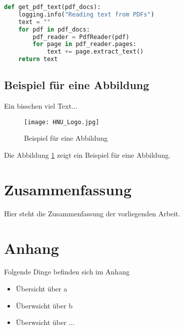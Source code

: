 \documentclass[12pt, a4paper, twoside]{article} %
\begin{document}
\begin{lstlisting}[language=Python, caption=Beispiel für Python-Code]
    def get_pdf_text(pdf_docs):
    logging.info("Reading text from PDFs")
    text = ""
    for pdf in pdf_docs:
        pdf_reader = PdfReader(pdf)
        for page in pdf_reader.pages:
            text += page.extract_text()
    return text
\end{lstlisting}



\subsection{Beispiel für eine Abbildung}
Ein bisschen viel Text... \lipsum[1] 

\begin{figure}[h!]
\centering
\texttt{[image: HNU\_Logo.jpg]}
\caption{Beispiel für eine Abbildung}
\label{fig:beispiel}
\end{figure}
Die Abbildung \ref{fig:beispiel} zeigt ein Beispiel für eine Abbildung. \lipsum[1]


\newpage 
\section{Zusammenfassung}
Hier steht die Zusammenfassung der vorliegenden Arbeit.


\newpage
\printbibliography %


\newpage
\section{Anhang}
Folgende Dinge befinden sich im Anhang
\begin{itemize}
    \item Übersicht über a
    \item Überwsicht über b
    \item Überwsicht über ...
\end{itemize}
\end{document}

